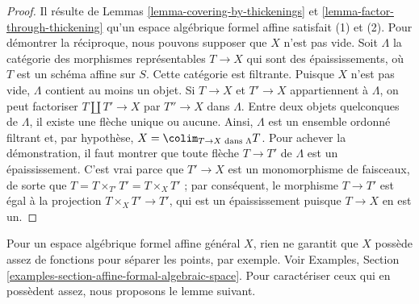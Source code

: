 \begin{proof}
Il résulte de Lemmas \ref{lemma-covering-by-thickenings} et
\ref{lemma-factor-through-thickening} qu'un espace algébrique formel affine
satisfait (1) et (2). Pour démontrer la réciproque, nous pouvons
supposer que $X$ n'est pas vide.
Soit $\Lambda$ la catégorie des morphismes représentables $T \to X$ qui sont des
épaississements, où $T$ est un schéma affine sur $S$. Cette catégorie
est filtrante. Puisque $X$ n'est pas vide, $\Lambda$ contient au moins un
objet. Si $T \to X$ et $T' \to X$ appartiennent à $\Lambda$, on peut
factoriser $T \amalg T' \to X$ par $T'' \to X$ dans $\Lambda$. Entre
deux objets quelconques de $\Lambda$, il existe une flèche unique ou aucune. Ainsi,
$\Lambda$ est un ensemble ordonné filtrant et, par hypothèse,
$X = \colim_{T \to X\text{ dans }\Lambda} T$. Pour achever la démonstration,
il faut montrer que toute flèche $T \to T'$ de $\Lambda$ est un épaississement.
C'est vrai parce que $T' \to X$ est un monomorphisme de faisceaux, de sorte que
$T = T \times_{T'} T' = T \times_X T'$ ; par conséquent, le morphisme
$T \to T'$ est égal à la projection $T \times_X T' \to T'$, qui est
un épaississement puisque $T \to X$ en est un.
\end{proof}

\noindent
Pour un espace algébrique formel affine général $X$, rien ne garantit
que $X$ possède assez de fonctions pour séparer les points, par exemple.
Voir Examples, Section \ref{examples-section-affine-formal-algebraic-space}.
Pour caractériser ceux qui en possèdent assez, nous proposons le lemme suivant.

